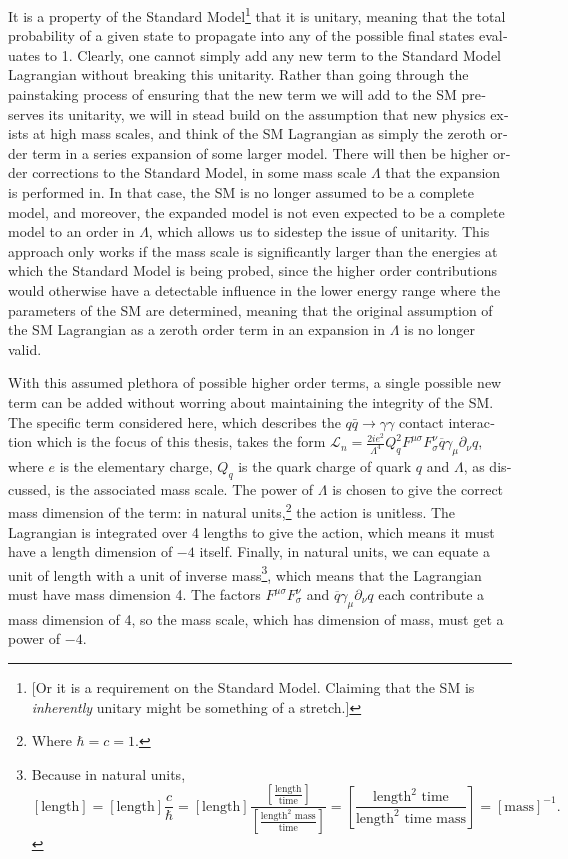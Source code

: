 \begin{english}
It is a property of the Standard Model\footnote{[Or it is a requirement on the Standard Model. Claiming that the SM is \emph{inherently} unitary might be something of a stretch.]} that it is unitary, meaning that the total probability of a given state to propagate into any of the possible final states evaluates to 1. Clearly, one cannot simply add any new term to the Standard Model Lagrangian without breaking this unitarity. Rather than going through the painstaking process of ensuring that the new term we will add to the SM preserves its unitarity, we will in stead build on the assumption that new physics exists at high mass scales, and think of the SM Lagrangian as simply the zeroth order term in a series expansion of some larger model. There will then be higher order corrections to the Standard Model, in some mass scale $\Lambda$ that the expansion is performed in. 
In that case, the SM is no longer assumed to be a complete model, and moreover, the expanded model is not even expected to be a complete model to an order in $\Lambda$, which allows us to sidestep the issue of unitarity.
This approach only works if the mass scale is significantly larger than the energies at which the Standard Model is being probed, since the higher order contributions would otherwise have a detectable influence in the lower energy range where the parameters of the SM are determined, meaning that the original assumption of the SM Lagrangian as a zeroth order term in an expansion in $\Lambda$ is no longer valid.

With this assumed plethora of possible higher order terms, a single possible new term can be added without worring about maintaining the integrity of the SM. The specific term considered here, which describes the $q\bar q\rightarrow\gamma\gamma$ contact interaction which is the focus of this thesis, takes the form \cite{rizzo}
\(\mathcal L_n = \frac{2ie^2}{\Lambda^4}Q_q^2F^{\mu\sigma}F^\nu_\sigma\overline{q}\gamma_\mu\partial_\nu q,\label{rizzo}\)
where $e$ is the elementary charge, $Q_q$ is the quark charge of quark $q$ and $\Lambda$, as discussed, is the associated mass scale. The power of $\Lambda$ is chosen to give the correct mass dimension of the term: in natural units,\footnote{Where $\hbar = c = 1$.} the action is unitless. The Lagrangian is integrated over 4 lengths to give the action, which means it must have a length dimension of $-4$ itself. Finally, in natural units, we can equate a unit of length with a unit of inverse mass\footnote{Because in natural units, \[[\text{length}]=[\text{length}]\frac{c}{\hbar}=[\text{length}]\frac{\left[\frac{\text{length}}{\text{time}}\right]}{\left[\frac{\text{length}^2\text{ mass}}{\text{time}}\right]}=\left[\frac{\text{length}^2\text{ time}}{\text{length}^2\text{ time}\text{ mass}}\right]=[\text{mass}]^{-1}. \]}, which means that the Lagrangian must have mass dimension 4. The factors $F^{\mu\sigma}F^\nu_\sigma$ and $\overline{q}\gamma_\mu\partial_\nu q$ each contribute a mass dimension of 4, so the mass scale, which has dimension of mass, must get a power of $-4$.


\end{english}
